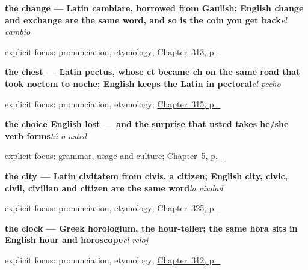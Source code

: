 \noindent\begin{minipage}[t]{\linewidth}
\raggedright
\textbf{the change — Latin cambiare, borrowed from Gaulish; English change and exchange are the same word, and so is the coin you get back}\enspace\emph{el cambio}\par
\footnotesize explicit focus: pronunciation, etymology; \hyperref[ch:el-mostrador]{Chapter~313, p.~\pageref*{ch:el-mostrador}}
\end{minipage}\par\smallskip

\noindent\begin{minipage}[t]{\linewidth}
\raggedright
\textbf{the chest — Latin pectus, whose ct became ch on the same road that took noctem to noche; English keeps the Latin in pectoral}\enspace\emph{el pecho}\par
\footnotesize explicit focus: pronunciation, etymology; \hyperref[ch:fuerza-y-risa]{Chapter~315, p.~\pageref*{ch:fuerza-y-risa}}
\end{minipage}\par\smallskip

\noindent\begin{minipage}[t]{\linewidth}
\raggedright
\textbf{the choice English lost — and the surprise that usted takes he/she verb forms}\enspace\emph{tú o usted}\par
\footnotesize explicit focus: grammar, usage and culture; \hyperref[ch:three-yous]{Chapter~5, p.~\pageref*{ch:three-yous}}
\end{minipage}\par\smallskip

\noindent\begin{minipage}[t]{\linewidth}
\raggedright
\textbf{the city — Latin civitatem from civis, a citizen; English city, civic, civil, civilian and citizen are the same word}\enspace\emph{la ciudad}\par
\footnotesize explicit focus: pronunciation, etymology; \hyperref[ch:pais-y-lugar]{Chapter~325, p.~\pageref*{ch:pais-y-lugar}}
\end{minipage}\par\smallskip

\noindent\begin{minipage}[t]{\linewidth}
\raggedright
\textbf{the clock — Greek horologium, the hour-teller; the same hora sits in English hour and horoscope}\enspace\emph{el reloj}\par
\footnotesize explicit focus: pronunciation, etymology; \hyperref[ch:lo-que-llevas]{Chapter~312, p.~\pageref*{ch:lo-que-llevas}}
\end{minipage}\par\smallskip

